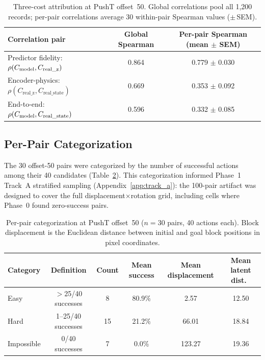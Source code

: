 \begin{table}[h]
\centering
\caption{Three-cost attribution at PushT offset~50.  Global correlations pool
all 1{,}200 records; per-pair correlations average 30 within-pair Spearman
values ($\pm$\,SEM).}
\label{tab:three-cost}
\begin{tabular}{lcc}
\toprule
Correlation pair & Global Spearman & Per-pair Spearman (mean $\pm$ SEM) \\
\midrule
Predictor fidelity: $\rho(C_\text{model}, C_\text{real\_z})$ & 0.864 & 0.779 $\pm$ 0.030 \\
Encoder-physics: $\rho(C_\text{real\_z}, C_\text{real\_state})$ & 0.669 & 0.353 $\pm$ 0.092 \\
End-to-end: $\rho(C_\text{model}, C_\text{real\_state})$ & 0.596 & 0.332 $\pm$ 0.085 \\
\bottomrule
\end{tabular}
\end{table}

\subsection{Per-Pair Categorization}
\label{app:per-pair-cat}

The 30 offset-50 pairs were categorized by the number of successful actions
among their 40 candidates (Table~\ref{tab:pair-categories}).  This
categorization informed Phase~1 Track~A stratified sampling
(Appendix~\ref{app:track_a}): the 100-pair artifact was designed to cover the
full displacement$\times$rotation grid, including cells where Phase~0 found
zero-success pairs.

\begin{table}[h]
\centering
\caption{Per-pair categorization at PushT offset~50 ($n=30$ pairs, 40 actions
each).  Block displacement is the Euclidean distance between initial and goal
block positions in pixel coordinates.}
\label{tab:pair-categories}
\begin{tabular}{lccccc}
\toprule
Category & Definition & Count & Mean success & Mean displacement & Mean latent dist.\ \\
\midrule
Easy & $>$25/40 successes & 8 & 80.9\% & 2.57 & 12.50 \\
Hard & 1--25/40 successes & 15 & 21.2\% & 66.01 & 18.84 \\
Impossible & 0/40 successes & 7 & 0.0\% & 123.27 & 19.36 \\
\bottomrule
\end{tabular}
\end{table}

